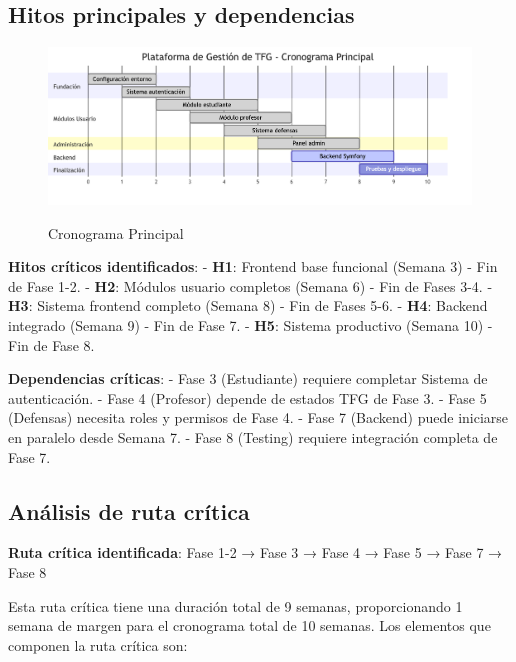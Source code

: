 \documentclass[12pt,a4paper,oneside]{report}
\providecommand{\pandocbounded}[1]{#1}
\begin{document}
\subsection{Hitos principales y
dependencias}\label{hitos-principales-y-dependencias}

\begin{figure}
\centering
\pandocbounded{\includegraphics[keepaspectratio,alt={Cronograma Principal}]{processed/images/03_planificacion_mermaid_1.png}}
\caption{Cronograma Principal}
\end{figure}

\textbf{Hitos críticos identificados}: - \textbf{H1}: Frontend base
funcional (Semana 3) - Fin de Fase 1-2. - \textbf{H2}: Módulos usuario
completos (Semana 6) - Fin de Fases 3-4. - \textbf{H3}: Sistema frontend
completo (Semana 8) - Fin de Fases 5-6. - \textbf{H4}: Backend integrado
(Semana 9) - Fin de Fase 7. - \textbf{H5}: Sistema productivo (Semana
10) - Fin de Fase 8.

\textbf{Dependencias críticas}: - Fase 3 (Estudiante) requiere completar
Sistema de autenticación. - Fase 4 (Profesor) depende de estados TFG de
Fase 3. - Fase 5 (Defensas) necesita roles y permisos de Fase 4. - Fase
7 (Backend) puede iniciarse en paralelo desde Semana 7. - Fase 8
(Testing) requiere integración completa de Fase 7.

\subsection{Análisis de ruta
crítica}\label{anuxe1lisis-de-ruta-cruxedtica}

\textbf{Ruta crítica identificada}: Fase 1-2 → Fase 3 → Fase 4 → Fase 5
→ Fase 7 → Fase 8

Esta ruta crítica tiene una duración total de 9 semanas, proporcionando
1 semana de margen para el cronograma total de 10 semanas. Los elementos
que componen la ruta crítica son:
\end{document}
